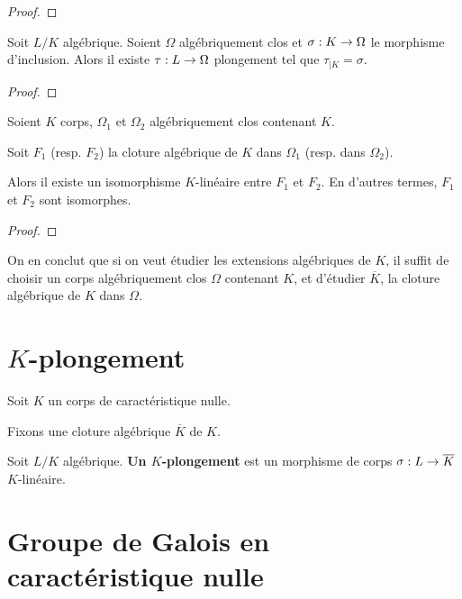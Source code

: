 \ifdefined\outputproof
\begin{proof}

\end{proof}
\fi

\begin{theorem} 
	Soit $L/K$ algébrique.
	Soient $\Omega$ algébriquement clos et $\sigma : K \rightarrow \Omega$ le
	morphisme d'inclusion.
	Alors il existe $\tau : L \rightarrow \Omega$ plongement tel que $\tau_{|K}
	= \sigma$.
\end{theorem}

\ifdefined\outputproof
\begin{proof}

\end{proof}
\fi

\begin{corollary}
	Soient $K$ corps, $\Omega_{1}$ et $\Omega_{2}$ algébriquement clos contenant
	$K$.

	Soit $F_{1}$ (resp. $F_{2}$) la cloture algébrique de $K$ dans $\Omega_{1}$
	(resp. dans $\Omega_{2}$).

	Alors il existe un isomorphisme $K$-linéaire entre $F_{1}$ et
	$F_{2}$. En d'autres termes, $F_{1}$ et $F_{2}$ sont isomorphes.
\end{corollary}

\ifdefined\outputproof
\begin{proof}

\end{proof}
\fi

On en conclut que si on veut étudier les extensions algébriques de $K$, il
suffit de choisir un corps algébriquement clos $\Omega$ contenant $K$, et
d'étudier $\overline{K}$, la cloture algébrique de $K$ dans $\Omega$.

\section{$K$-plongement}

Soit $K$ un corps de caractéristique nulle.

Fixons une cloture algébrique $\overline{K}$ de $K$.

\begin{definition}
	Soit $L/K$ algébrique.
	\textbf{Un $K$-plongement} est un morphisme de corps
	$\sigma : L \rightarrow \overline{K}$ $K$-linéaire.
\end{definition}

\section{Groupe de Galois en caractéristique nulle}

